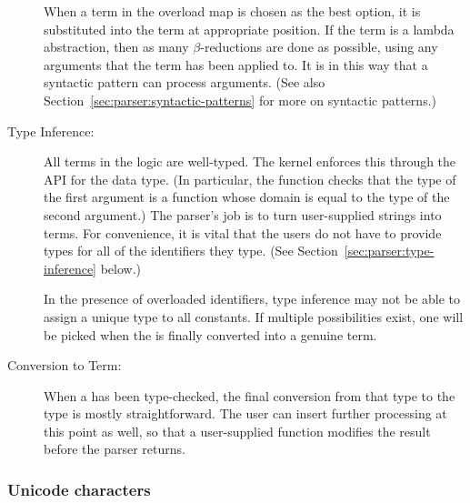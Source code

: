 \begin{description}
  When a term in the overload map is chosen as the best option, it is
  substituted into the term at appropriate position.  If the term is a
  lambda abstraction, then as many $\beta$-reductions are done as
  possible, using any arguments that the term has been applied to.  It
  is in this way that a syntactic pattern can process arguments.  (See
  also Section~\ref{sec:parser:syntactic-patterns} for more on
  syntactic patterns.)
\item[Type Inference:] %
  All terms in the \HOL{} logic are well-typed.  The kernel enforces
  this through the API for the  data type.  (In particular,
  the  function %
  checks that the type of the first argument is a function whose
  domain is equal to the type of the second argument.)  The parser's
  job is to turn user-supplied strings into terms.  For convenience,
  it is vital that the users do not have to provide types for all of the
  identifiers they type. (See Section~\ref{sec:parser:type-inference}
  below.)

  In the presence of overloaded identifiers, type inference may not be
  able to assign a unique type to all constants.  If multiple
  possibilities exist, one will be picked when the  is finally
  converted into a genuine term.
\item[Conversion to Term:]%
  When a  has been type-checked, the final conversion from
  that type to the  type is mostly straightforward.  The user
  can insert further processing at this point as well, so that a
  user-supplied function modifies the result before the parser
  returns.
\end{description}

\subsubsection{Unicode characters}
\label{sec:parser:unicode-characters}

